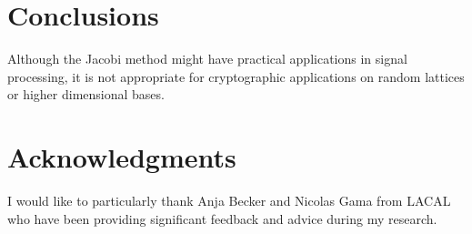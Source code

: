 \documentclass[10pt, a4paper]{article}
\begin{document}
\section{Conclusions}

Although the Jacobi method might have practical applications in signal processing, it is not appropriate for cryptographic applications on random lattices or higher dimensional bases.

\section{Acknowledgments}
I would like to particularly thank Anja Becker and Nicolas Gama from LACAL who have been providing significant feedback and advice during my research.



\end{document}
